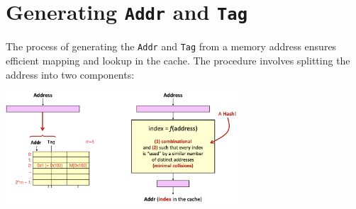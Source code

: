 \section{Generating \texttt{Addr} and \texttt{Tag}}
The process of generating the \texttt{Addr} and \texttt{Tag} from a memory address ensures efficient mapping and lookup in the cache. The procedure involves splitting the address into two components:
\begin{center}
    \includegraphics[width=0.65\textwidth]{chapters/chapter3a/images/gen.png}
\end{center}
